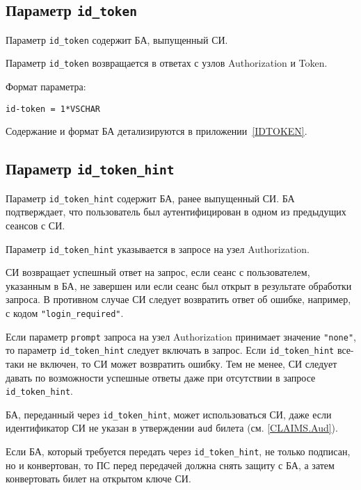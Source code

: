 \subsection{Параметр \lstinline{id_token}}\label{PARAMS.IdToken}

Параметр \lstinline{id_token} содержит БА, выпущенный СИ.

Параметр \lstinline{id_token} возвращается в ответах с узлов Authorization и Token.

Формат параметра: 
\begin{lstlisting}
id-token = 1*VSCHAR
\end{lstlisting}

Содержание и формат БА детализируются в приложении~\ref{IDTOKEN}. 


\subsection{Параметр \lstinline{id_token_hint}}\label{PARAMS.IdTokenHint}

Параметр \lstinline{id_token_hint} содержит БА, ранее выпущенный СИ.
БА подтверждает, что пользователь был аутентифицирован в одном из предыдущих 
сеансов с СИ.

Параметр \lstinline{id_token_hint} указывается в запросе на узел Authorization. 

СИ возвращает успешный ответ на запрос, если сеанс с пользователем, указанным в 
БА, не завершен или если сеанс был открыт в результате обработки запроса. В 
противном случае СИ следует возвратить ответ об ошибке, например, с кодом 
\lstinline{"login_required"}.

Если параметр \lstinline{prompt} запроса на узел Authorization 
принимает значение \lstinline{"none"}, то параметр \lstinline{id_token_hint} 
следует включать в запрос. 
%
Если \lstinline{id_token_hint} все-таки не включен, то СИ может возвратить 
ошибку.
%
Тем не менее, СИ следует давать по возможности успешные ответы даже при 
отсутствии в запросе \lstinline{id_token_hint}.

БА, переданный через \lstinline{id_token_hint}, может использоваться СИ, 
даже если идентификатор СИ не указан в утверждении \lstinline{aud} билета 
(см. \ref{CLAIMS.Aud}).

Если БА, который требуется передать через \lstinline{id_token_hint}, 
не только подписан, но и конвертован, то ПС перед передачей должна снять защиту 
с БА, а затем конвертовать билет на открытом ключе СИ.

